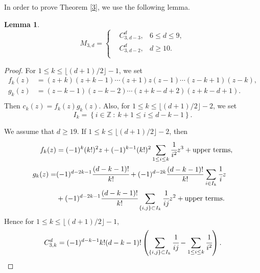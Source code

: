 \documentclass[12pt]{amsart}
\newtheorem{lemma}[theorem]{Lemma}
\theoremstyle{definition}
\theoremstyle{remark}
\numberwithin{equation}{section}
\def\NZQ{\mathbb}               %
\def\ZZ{{\NZQ Z}}
\begin{document}
In order to prove Theorem \ref{3}, we use the following lemma.
	\begin{lemma}
		\label{lem3}
		\begin{displaymath}
		M_{3,d}= \left\{
			\begin{aligned}
			& C^d_{3,d-3}, & 6\leq d \leq 9, \\
			& C^d_{3,d-2}, & d \geq 10.\\
			\end{aligned}
			\right.
		\end{displaymath}
	\end{lemma}
	\begin{proof}		
		For $1 \leq k \leq \lfloor (d+1)/2\rfloor -1$,
		we set 
		\begin{displaymath}
		\begin{aligned}
		f_k(z)&=(z+k)(z+k-1)\cdots(z+1)z(z-1)\cdots(z-k+1)(z-k),\\
		g_k(z)&=(z-k-1)(z-k-2)\cdots(z+k-d+2)(z+k-d+1).\\
		\end{aligned} 
		\end{displaymath}
		Then $c_k(z)=f_k(z)g_k(z)$.
		Also, for  $1 \leq k \leq \lfloor(d+1)/2 \rfloor -2$,
		we set 
		$$I_k=\left\{i \in \ZZ \ :\  k+1\leq i \leq d-k-1 \right\}.$$
		
		We assume that $d \geq 19$.
	If $1 \leq k \leq \lfloor (d+1)/2 \rfloor -2$, then
	\begin{displaymath}
	\begin{aligned}
	f_k(z)&=(-1)^{k}(k!)^2z+(-1)^{k-1}(k!)^2\sum\limits_{1 \leq i \leq k}
	\cfrac{1}{i^2}z^3+\text{upper terms},\\
	g_k(z)=&(-1)^{d-2k-1}\cfrac{(d-k-1)!}{k!}+(-1)^{d-2k}\frac{(d-k-1)!}{k!}\sum\limits_{i\in I_k}\cfrac{1}{i}z\\
	&+(-1)^{d-2k-1}\cfrac{(d-k-1)!}{k!}\sum\limits_{\left\{i,j\right\}\subset I_k}\cfrac{1}{ij}z^2+\text{upper terms}.
	\end{aligned} 
	\end{displaymath}
Hence for $1 \leq k \leq\lfloor (d+1)/2\rfloor -1$,
$$C^d_{3,k}=(-1)^{d-k-1}k!(d-k-1)!\left(\sum\limits_{\left\{i,j\right\}\subset I_k}\cfrac{1}{ij}-\sum\limits_{1 \leq i \leq k}
\cfrac{1}{i^2}\right).$$


\end{proof}
\end{document}
